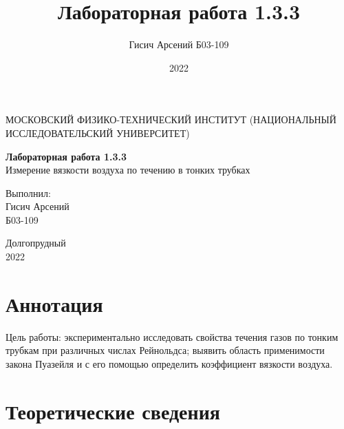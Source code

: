 \documentclass[a4paper, 12pt]{article}
\title{Лабораторная работа 1.3.3}
\author{Гисич Арсений Б03-109}
\date{2022}
\begin{document}
	\begin{center}
		{\large МОСКОВСКИЙ ФИЗИКО-ТЕХНИЧЕСКИЙ ИНСТИТУТ (НАЦИОНАЛЬНЫЙ ИССЛЕДОВАТЕЛЬСКИЙ УНИВЕРСИТЕТ)}
	\end{center}
	\vspace{5 cm}
	{\Large
		\begin{center}
			{\bf Лабораторная работа 1.3.3}\\[0.2 cm]
			Измерение вязкости воздуха по течению в тонких трубках
		\end{center}
	}
	\vspace{4 cm}
	\begin{flushright}
		{\Large Выполнил: \\
			\vspace{0.2 cm}
			Гисич Арсений \\
			\vspace{0.2 cm}
			Б03-109 \\}
	\end{flushright}
	\vspace{9 cm}
	\begin{center}
		Долгопрудный\\[0.1 cm]
		2022
	\end{center}
\thispagestyle{empty}

\section{Аннотация}

\par Цель работы: экспериментально исследовать свойства течения газов по тонким трубкам при различных числах Рейнольдса; выявить область применимости закона Пуазейля и с его помощью определить коэффициент вязкости воздуха.

\section{Теоретические сведения}
\end{document}
